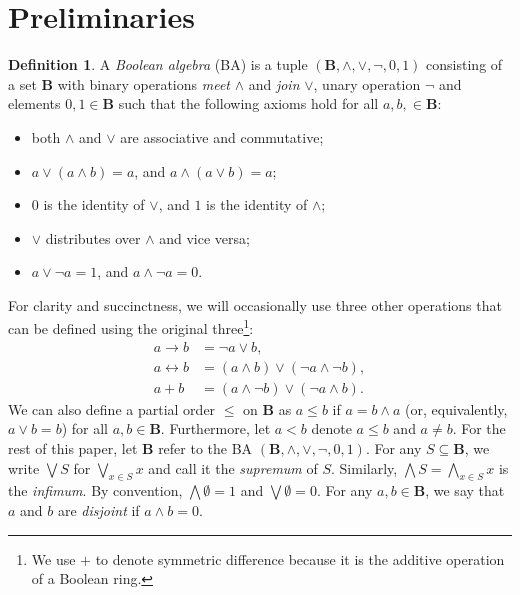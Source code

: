 \documentclass{article}
\theoremstyle{definition}
\newtheorem{definition}[theorem]{Definition}
\theoremstyle{remark}
\begin{document}
\section{Preliminaries}


\begin{definition} \label{def:ba}
  A \emph{Boolean algebra} (BA) is a tuple $(\mathbf{B}, \land, \lor, \neg, 0,
  1)$ consisting of a set $\mathbf{B}$ with binary operations \emph{meet}
  $\land$ and \emph{join} $\lor$, unary operation $\neg$ and elements $0, 1 \in
  \mathbf{B}$ such that the following axioms hold for all $a, b, \in
  \mathbf{B}$:
  \begin{itemize}
  \item both $\land$ and $\lor$ are associative and commutative;
  \item $a \lor (a \land b) = a$, and $a \land (a \lor b) = a$;
  \item $0$ is the identity of $\lor$, and $1$ is the identity of $\land$;
  \item $\lor$ distributes over $\land$ and vice versa;
  \item $a \lor \neg a = 1$, and $a \land \neg a = 0$.
  \end{itemize}
\end{definition}

For clarity and succinctness, we will occasionally use three other operations
that can be defined using the original three\footnote{We use $+$ to denote
  symmetric difference because it is the additive operation of a Boolean ring.}:
\begin{align*}
  a \to b &= \neg a \lor b, \\
  a \leftrightarrow b &= (a \land b) \lor (\neg a \land \neg b), \\
  a + b &= (a \land \neg b) \lor (\neg a \land b).
\end{align*}
We can also define a partial order $\le$ on $\mathbf{B}$ as $a \le b$ if $a = b
\land a$ (or, equivalently, $a \lor b = b$) for all $a, b \in \mathbf{B}$.
Furthermore, let $a < b$ denote $a \le b$ and $a \ne b$. For the rest of this
paper, let $\mathbf{B}$ refer to the BA $(\mathbf{B}, \land, \lor, \neg, 0, 1)$.
For any $S \subseteq \mathbf{B}$, we write $\bigvee S$ for $\bigvee_{x \in S} x$
and call it the \emph{supremum} of $S$. Similarly, $\bigwedge S = \bigwedge_{x
  \in S} x$ is the \emph{infimum}. By convention, $\bigwedge \emptyset = 1$ and
$\bigvee \emptyset = 0$. For any $a, b \in \mathbf{B}$, we say that $a$ and $b$
are \emph{disjoint} if $a \land b = 0$.
\end{document}
